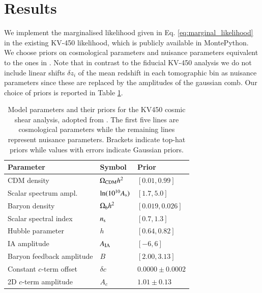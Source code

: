 \documentclass{aa}
\begin{document}
\section{Results}
We implement the marginalised likelihood given in Eq. \ref{eq:marginal_likelihood} in the existing KV-450 likelihood, which is publicly available in {\sc MontePython}. We choose priors on cosmological parameters and  nuisance parameters equivalent to the ones in . Note that in contrast to the fiducial KV-450 analysis we do not include linear shifts $\delta z_i$ of the mean redshift in each tomographic bin as nuisance parameters since these are replaced by the amplitudes of the gaussian comb. Our choice of priors is reported in Table \ref{tab:priors}.
\begin{table}
\label{tab:priors}
\begin{tabular}{lll}
\hline
Parameter & Symbol & Prior\\
\hline
CDM density & $\Omega_{\rm CDM} h^2$ & $[0.01, 0.99]$\\
Scalar spectrum ampl. & $\ln(10^{10}A_{\rm s})$ & $[1.7, 5.0]$\\
Baryon density & $\Omega_{\rm b} h^2$ & $[0.019, 0.026]$ \\
Scalar spectral index & $n_{\rm s}$ & $[0.7, 1.3]$ \\
Hubble parameter & $h$ & $[0.64, 0.82]$ \\
\hline
IA amplitude & $A_{\rm IA}$ & $[-6, 6]$\\
Baryon feedback amplitude & $B$ & $[2.00, 3.13]$\\
Constant $c$-term offset & $\delta c$ & $0.0000\pm0.0002$ \\
2D $c$-term amplitude & $A_c$ & $1.01\pm0.13$\\
\hline
\end{tabular}
\caption{Model parameters and their priors for the KV450 cosmic shear analysis, adopted from . The first five lines are cosmological parameters while the remaining lines represent nuisance parameters. Brackets indicate top-hat priors while values with errors indicate Gaussian priors.}
\end{table}
\end{document}
